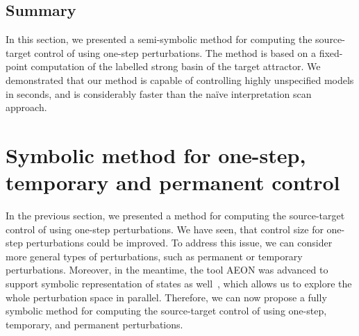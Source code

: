 \subsection{Summary}
In this section, we presented a semi-symbolic method for computing the source-target control of \PBN{} using one-step perturbations. The method is based on a fixed-point computation of the labelled strong basin of the target attractor. We demonstrated that our method is capable of controlling highly unspecified models in seconds, and is considerably faster than the na\"ive interpretation scan approach.

\section{Symbolic method for one-step, temporary and permanent control}
\label{sec:ostp_symbolic}

In the previous section, we presented a method for computing the source-target control of \PBN{} using one-step perturbations. We have seen, that control size for one-step perturbations could be improved. To address this issue, we can consider more general types of perturbations, such as permanent or temporary perturbations. Moreover, in the meantime, the tool AEON was advanced to support symbolic representation of states as well~\cite{benevs2022bdd}, which allows us to explore the whole perturbation space in parallel. Therefore, we can now propose a fully symbolic method for computing the source-target control of \PBN{} using one-step, temporary, and permanent perturbations.


